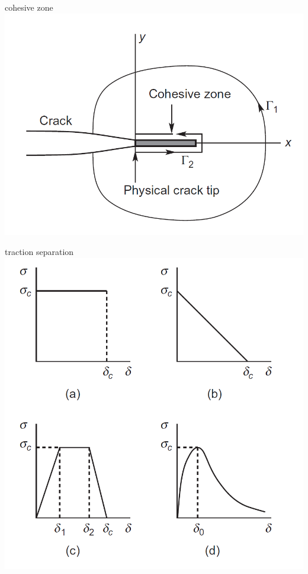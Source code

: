 \documentclass[
  letterpaper,
  ignorenonframetext,
  aspectratio=43,
  handout,
  12pt]{beamer}
\let\Oldincludegraphics\includegraphics
\renewcommand{\includegraphics}[2][]{\Oldincludegraphics[width=\textwidth,height=0.7\textheight,keepaspectratio]{#2}}
\begin{document}
\begin{frame}{cohesive zone}
\protect\hypertarget{cohesive-zone-1}{}
\includegraphics{../images/cohesive_zone.PNG}
\end{frame}

\begin{frame}{traction separation}
\protect\hypertarget{traction-separation}{}
\includegraphics{../images/traction_separation.PNG}
\end{frame}
\end{document}
